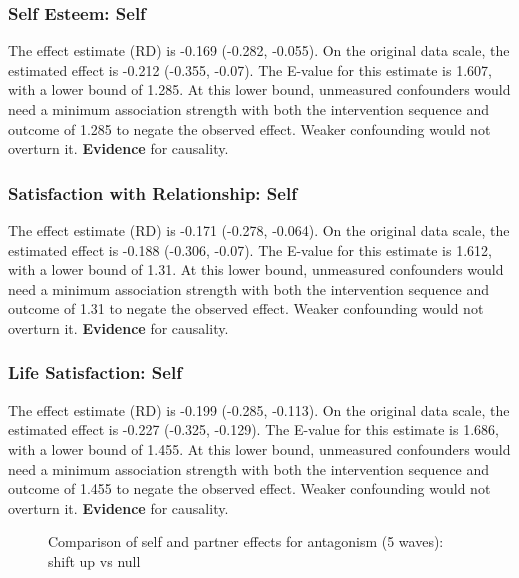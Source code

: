 \documentclass[
  singlecolumn]{article}
\begin{document}
\subsubsection{Self Esteem: Self}\label{self-esteem-self-10}

The effect estimate (RD) is -0.169 (-0.282, -0.055). On the original
data scale, the estimated effect is -0.212 (-0.355, -0.07). The E-value
for this estimate is 1.607, with a lower bound of 1.285. At this lower
bound, unmeasured confounders would need a minimum association strength
with both the intervention sequence and outcome of 1.285 to negate the
observed effect. Weaker confounding would not overturn it.
\textbf{Evidence} for causality.

\subsubsection{Satisfaction with Relationship:
Self}\label{satisfaction-with-relationship-self-10}

The effect estimate (RD) is -0.171 (-0.278, -0.064). On the original
data scale, the estimated effect is -0.188 (-0.306, -0.07). The E-value
for this estimate is 1.612, with a lower bound of 1.31. At this lower
bound, unmeasured confounders would need a minimum association strength
with both the intervention sequence and outcome of 1.31 to negate the
observed effect. Weaker confounding would not overturn it.
\textbf{Evidence} for causality.

\subsubsection{Life Satisfaction: Self}\label{life-satisfaction-self-10}

The effect estimate (RD) is -0.199 (-0.285, -0.113). On the original
data scale, the estimated effect is -0.227 (-0.325, -0.129). The E-value
for this estimate is 1.686, with a lower bound of 1.455. At this lower
bound, unmeasured confounders would need a minimum association strength
with both the intervention sequence and outcome of 1.455 to negate the
observed effect. Weaker confounding would not overturn it.
\textbf{Evidence} for causality.

\begin{figure}


\caption{\label{fig-results-antagonism-self-partner-up-long-comparison}Comparison
of self and partner effects for antagonism (5 waves): shift up vs null}

\end{figure}%
\end{document}
